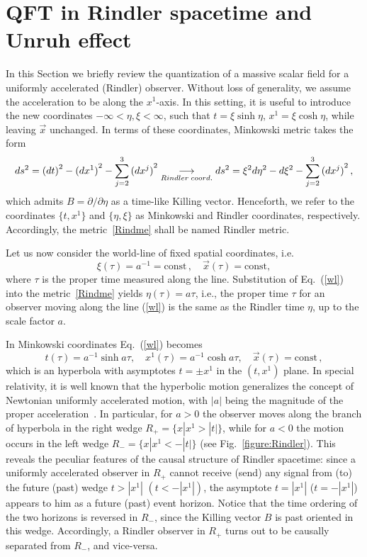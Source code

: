 \documentclass[floats,prd,aps,amssymb,nofootinbib,showkeys]{revtex4}
\newcommand{\be}{\begin{equation}}\newcommand{\ee}{\end{equation}}
\begin{document}
\section{QFT in Rindler spacetime and Unruh effect}
\label{UE}
In this Section we briefly review the quantization of a massive scalar field
for a uniformly accelerated (Rindler) observer. Without loss
of generality, we assume the acceleration to be  
along the $x^1$-axis. In this setting, it is useful to 
introduce the new coordinates $-\infty<\eta,\xi<\infty$, such that
$t=\xi\sinh\eta$, $x^1=\xi\cosh\eta$, while leaving $\vec{x}$ unchanged. 
In terms of these coordinates, Minkowski metric takes the form
\be
\label{Rindme}
ds^2={(dt)}^2-{(dx^1)}^2-\sum_{j=2}^{3}{(dx^j)}^2\underset{\tiny{Rindler\; coord.}}{\longrightarrow}ds^2=\xi^2d\eta^2-d\xi^2-\sum_{j=2}^{3}{(dx^j)}^2\,, 
\ee 
which admits $B=\partial/\partial{\eta}$ as a time-like
Killing vector. Henceforth, we refer to the coordinates 
$\{t,x^1\}$ and $\{\eta, \xi\}$ as Minkowski and Rindler 
coordinates, respectively. Accordingly, the metric~\eqref{Rindme} 
shall be named Rindler metric. 


Let us now consider the world-line of fixed
spatial coordinates, i.e.
\be
\label{wl}
\xi(\tau)=a^{-1}=\mathrm{const}\,,\quad \vec{x}(\tau)=\mathrm{const}, 
\ee
where $\tau$ is the proper time measured along the line. 
Substitution of Eq.~(\ref{wl}) into the metric~\eqref{Rindme}
yields $\eta(\tau)=a\tau$, 
i.e., the proper time $\tau$ for an observer moving
along the line (\ref{wl}) 
is the same as the Rindler time $\eta$, 
up to the scale factor $a$. 

In Minkowski coordinates Eq.~(\ref{wl}) becomes
\begin{equation}
t(\tau)=a^{-1}\sinh a\tau,\quad x^1(\tau)=a^{-1}\cosh a\tau,\quad \vec{x}(\tau)=\mathrm{const}\,, 
\label{minkl}
\end{equation}
which is an hyperbola with asymptotes $t=\pm x^1$
in the $(t,x^1)$ plane. 
In special relativity, it is well known that the hyperbolic motion 
generalizes the concept of Newtonian uniformly accelerated motion, 
with $|a|$ being the magnitude of the proper acceleration~\cite{Mukhanov}.
In particular, for $a>0$ the observer moves along the branch
of hyperbola in the right wedge $R_+=\{x|x^1>|t|\}$, 
while for $a<0$ the motion occurs in the left wedge $R_-=\{x|x^1<-|t|\}$ (see Fig.~\ref{figure:Rindler}). 
This reveals the peculiar features of the causal structure of Rindler spacetime:
since a uniformly accelerated observer in 
$R_+$ cannot receive (send) 
any signal from (to) the future (past) wedge $t > |x^1|$ $(t < -|x^1|)$, 
the asymptote $t=|x^1|$ ($t=-|x^1|$) appears to him
as a future (past) event horizon. Notice that
the time ordering of the two horizons is reversed in $R_-$, 
since the Killing vector $B$ is
past oriented in this wedge.  
Accordingly, a Rindler observer in $R_{+}$ turns out to be
causally separated from $R_{-}$, and vice-versa.  
\end{document}
